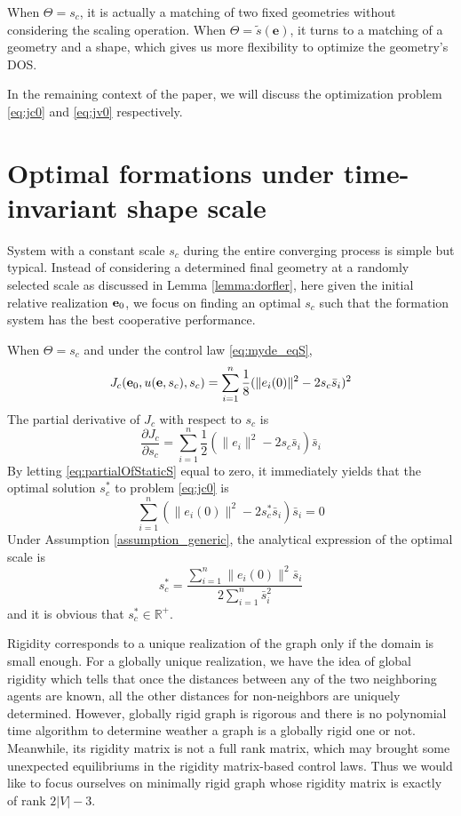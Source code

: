\documentclass[times]{rncauth}
\newcommand{\be}{\ensuremath \mathbf{e}}
\begin{document}
When $\Theta=s_c$, it is actually a matching of two fixed geometries without considering the scaling operation. When $\Theta=\tilde{s}(\mathbf{e})$, it turns to a matching of a geometry and a  shape, which gives us more flexibility to optimize  the geometry's DOS.


In the remaining context of the paper, we will discuss the
optimization problem \eqref{eq:jc0} and \eqref{eq:jv0} respectively.

\section{Optimal formations under time-invariant shape
scale}\label{sec:inva} System with a constant scale $s_c$ during the
entire converging process is simple but typical. Instead of
considering a determined final geometry at a randomly selected scale
as discussed in Lemma \ref{lemma:dorfler}, here given the initial
relative realization $\be_0$, we focus on finding an optimal $s_c$
 such that the formation system has the best cooperative performance.


When $\Theta=s_c$ and under the control law \eqref{eq:myde_eqS},
\begin{equation}\label{eq:constant_J1}
  J_c(\mathbf{e}_0,u(\be,s_c),s_c)=\sum^n_{i=1}\frac{1}{8}(\|e_i(0)\|^2-2s_c\bar{s}_i)^2
\end{equation}
The partial derivative of $J_c$ with respect to $s_c$ is
\begin{equation}\label{eq:partialOfStaticS}
  \frac{\partial J_c}{\partial
  s_c}=\sum_{i=1}^n\frac{1}{2}(\|e_i\|^2-2s_c\bar{s}_i)\bar{s}_i
  \end{equation}
  By letting \eqref{eq:partialOfStaticS} equal to zero, it immediately yields
  that the optimal  solution $s^*_c$ to problem \eqref{eq:jc0} is
  \begin{equation}
    \sum_{i=1}^n(\|e_i(0)\|^2-2s_c^*\bar{s}_i)\bar{s}_i=0
  \end{equation}
  Under Assumption \ref{assumption_generic}, the analytical expression of the optimal scale is
  \begin{equation}\label{eq:optStaticS}
    s^*_c=\frac{\sum_{i=1}^n\|e_i(0)\|^2\bar{s}_i}{2\sum_{i=1}^n \bar{s}_i^2}
  \end{equation}
  and it is obvious that $s^*_c\in\mathbb{R}^+$.


Rigidity corresponds to a unique realization of the graph only if
the domain is small enough. For a globally unique realization, we
have the idea of global rigidity\cite{Anderson08rigidMagazine} which
tells that once the distances between any of the two neighboring
agents are known, all the other distances for non-neighbors are
uniquely determined. However, globally rigid graph is rigorous and
there is no polynomial time algorithm to determine weather a graph
is a globally rigid one or not. Meanwhile, its rigidity matrix is
not a full rank matrix, which may brought some unexpected
equilibriums in the rigidity matrix-based control laws. Thus we
would like to focus ourselves on minimally rigid graph whose
rigidity matrix is exactly of rank $2|V|-3$.
\end{document}
